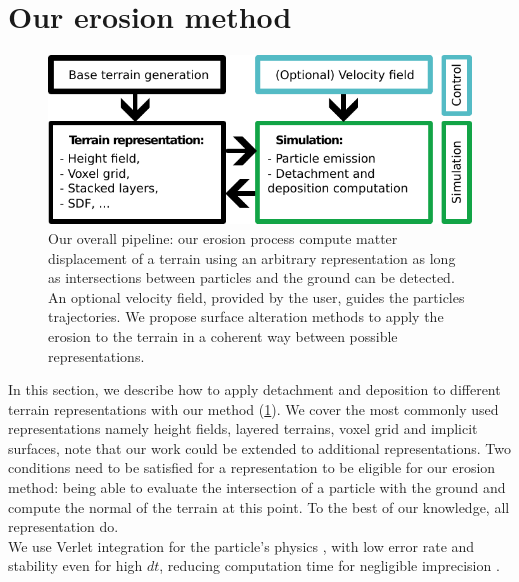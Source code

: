 \section{Our erosion method}
\label{sec:erosion_application_on_representations}
\begin{figure}[ht]
    \centering
    \includegraphics{figures/figure_pipeline.pdf}
    \caption{Our overall pipeline: our erosion process compute matter displacement of a terrain using an arbitrary representation as long as intersections between particles and the ground can be detected. An optional velocity field, provided by the user, guides the particles trajectories. We propose surface alteration methods to apply the erosion to the terrain in a coherent way between possible representations. }
    \label{fig:erosion_figure_pipeline}
\end{figure}
In this section, we describe how to apply detachment and deposition to different terrain representations with our method (\cref{fig:erosion_figure_pipeline}). We cover the most commonly used representations namely height fields, layered terrains, voxel grid and implicit surfaces, note that our work could be extended to additional representations. Two conditions need to be satisfied for a representation to be eligible for our erosion method: being able to evaluate the intersection of a particle with the ground and compute the normal of the terrain at this point. To the best of our knowledge, all representation do. \\
We use Verlet integration for the particle's physics  \cite{Verlet1967}, with low error rate and stability even for high $dt$, reducing computation time for negligible imprecision \cite{Baraff1998, Swope1982}.


